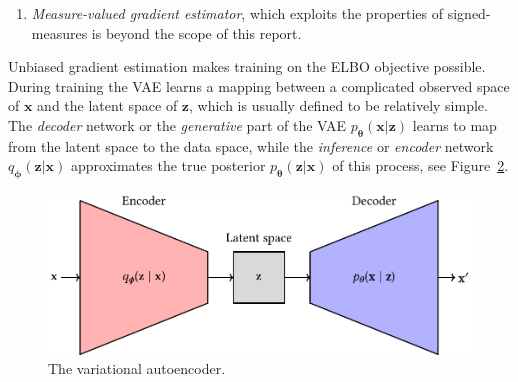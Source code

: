 \documentclass[final,3p,times,twocolumn]{elsarticle}
\begin{document}
\begin{enumerate}
\begin{figure}
		\label{fig:reparam}
	\end{figure}
	This was the gradient estimator originally used in the VAE implementation~\cite{kingma2013auto} there named as the \emph{reparametrization trick}, see also Figure~\ref{fig:reparam}. In many cases the transformation paths are so simple they can be implemented in one line of code, referred to as \emph{one-liners}. The pathwise-estimator can only be used on differentiable cost functions, but is easy to implement and crucially has lower variance than the score-function estimator. 
	
	\item \emph{Measure-valued gradient estimator}, which exploits the properties of signed-measures is beyond the scope of this report.	
\end{enumerate}
	Unbiased gradient estimation makes training on the ELBO objective possible. During training the VAE learns a mapping between a complicated observed space of $\mathbf{x}$ and the latent space of $\mathbf{z}$, which is usually defined to be relatively simple. The \emph{decoder} network or the \emph{generative} part of the VAE $p_{\boldsymbol{\theta}}(\mathbf{x} | \mathbf{z})$ learns to map from the latent space to the data space, while the \emph{inference} or \emph{encoder} network $q_{\mathbf{\phi}}(\mathbf{z}|\mathbf{x})$ approximates the true posterior $p_{\mathbf{\theta}}(\mathbf{z}|\mathbf{x})$ of this process, see Figure~\ref{fig:vae_basic}. 

	\begin{figure}
		\centering
		\includegraphics[width=\linewidth]{../diagrams/vae/vae_diagram.pdf}
		\caption{\label{fig:vae_basic} The variational autoencoder. }
	\end{figure}
\end{document}
